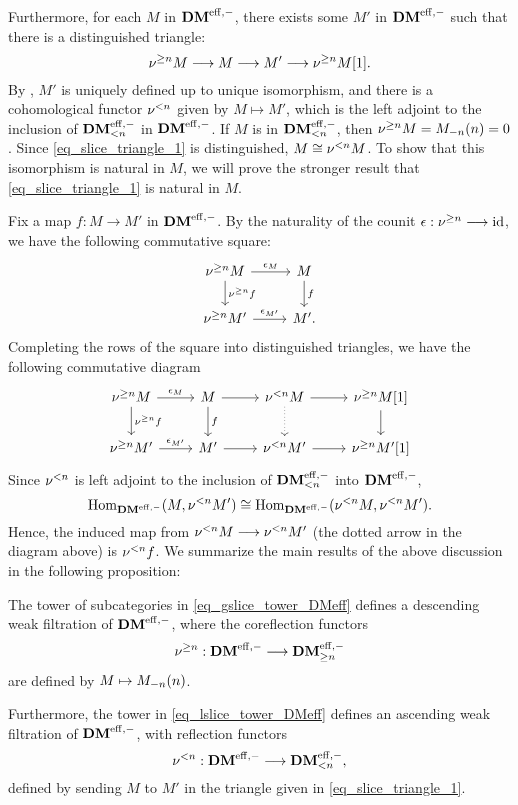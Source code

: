 Furthermore, for each $M$ in $\DMeff$, there exists some $M'$ in 
$\DMeff$ such that there is a distinguished triangle:
\begin{equation}\label{eq_slice_triangle_1}
\sgDM{n}M \to M \to M' \to \sgDM{n}M[1].
\end{equation}
By \cite[1.4(i, ii)]{HuKa}, $M'$ is uniquely defined up to 
unique isomorphism, and there is a cohomological functor 
$\slDM{n}$ given by $M \mapsto M'$, which is the left adjoint to 
the inclusion of $\LFiltDM[n]{\DMeff}$ in $\DMeff$. If $M$ is in 
$\LFiltDM[n]{\DMeff}$, then $\sgDM{n} M = \LHI[n]{\RHI[n]{M}} = 
0$. Since \eqref{eq_slice_triangle_1} is distinguished, $M \cong 
\slDM{n} M$. To show that this isomorphism is natural in $M$, we 
will prove the stronger result that \eqref{eq_slice_triangle_1} is 
natural in $M$.

Fix a map $f: M \to M'$ in $\DMeff$. By the naturality of the 
counit $\epsilon: \sgDM{n} \to \id$, we have the following 
commutative square:
\[
\begin{tikzcd}
\sgDM{n}M \arrow{r}{\epsilon_M} \arrow{d}{\sgDM{n}f} &
M \arrow{d}{f} \\
\sgDM{n}M' \arrow{r}{\epsilon_{M'}} &
M'.
\end{tikzcd}
\]
Completing the rows of the square into distinguished triangles,
we have the following commutative diagram
\[
\begin{tikzcd}
\sgDM{n}M \arrow{r}{\epsilon_M} \arrow{d}{\sgDM{n}f} &
M \arrow{d}{f} \arrow{r} &
\slDM{n}M \arrow[dotted]{d} \arrow{r} &
\sgDM{n}M[1] \arrow{d} \\
\sgDM{n}M' \arrow{r}{\epsilon_{M'}} &
M' \arrow{r} &
\slDM{n}M' \arrow{r} &
\sgDM{n}M'[1]
\end{tikzcd}
\]
Since $\slDM{n}$ is left adjoint to the inclusion of 
$\LFiltDM[n]{\DMeff}$ into $\DMeff$,
\[
\homDMf(M, \slDM{n}M') \cong \homDMf(\slDM{n}M, \slDM{n}M').
\]
Hence, the induced map from $\slDM{n} M \to \slDM{n} M'$ (the 
dotted arrow in the diagram above) is $\slDM{n} f$. We summarize 
the main results of the above discussion in the following 
proposition:

\begin{prop}\label{prop_slice_DMeff}
The tower of subcategories in \eqref{eq_gslice_tower_DMeff} 
defines a descending weak filtration of $\DMeff$, where the
coreflection functors
\[
\sgDM{n}: \DMeff \to \GFiltDM[n]{\DMeff}
\] 
are defined by $M \mapsto \tZ[n]{\hZ[n]{M}}$.

Furthermore, the tower in \eqref{eq_lslice_tower_DMeff}
defines an ascending weak filtration of $\DMeff$, with
reflection functors 
\[
\slDM{n}: \DMeff \to \LFiltDM[n]{\DMeff},
\]
defined by sending $M$ to $M'$ in the triangle given in 
\eqref{eq_slice_triangle_1}.
\end{prop}

